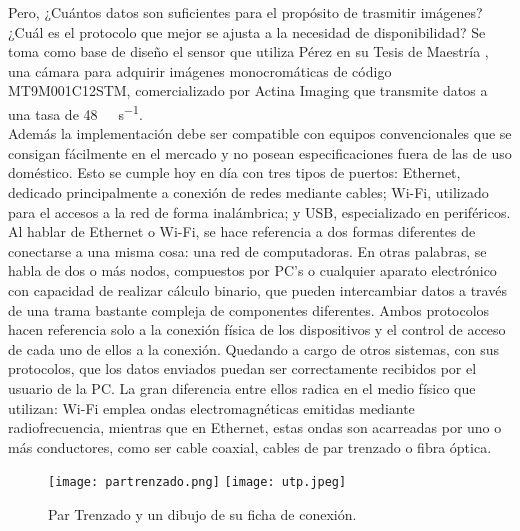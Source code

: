 


Pero, ¿Cuántos datos son suficientes para el propósito de trasmitir imágenes? ¿Cuál es el protocolo que mejor se ajusta a la necesidad de disponibilidad? Se toma como base de diseño el sensor que utiliza Pérez en su Tesis de Maestría \cite{Perez2018}, una cámara para adquirir imágenes monocromáticas de código MT9M001C12STM, comercializado por Actina Imaging \cite{MicronTechnology2004} que transmite datos a una tasa de \SI{48}{\mega\bit\per\second}.\\

Además la implementación debe ser compatible con equipos convencionales que se consigan fácilmente en el mercado y no posean especificaciones fuera de las de uso doméstico. Esto se cumple hoy en día con tres tipos de puertos: Ethernet, dedicado principalmente a conexión de redes mediante cables; Wi-Fi, utilizado para el accesos a la red de forma inalámbrica; y USB, especializado en periféricos.\\

Al hablar de Ethernet o Wi-Fi, se hace referencia a dos formas diferentes de conectarse a una misma cosa: una red de computadoras. En otras palabras, se habla de dos o más nodos, compuestos por PC's o cualquier aparato electrónico con capacidad de realizar cálculo binario, que pueden intercambiar datos a través de una trama bastante compleja de componentes diferentes. Ambos protocolos hacen referencia solo a la conexión física de los dispositivos y el control de acceso de cada uno de ellos a la conexión. Quedando a cargo de otros sistemas, con sus protocolos, que los datos enviados puedan ser correctamente recibidos por el usuario de la PC. La gran diferencia entre ellos radica en el medio físico que utilizan: Wi-Fi emplea ondas electromagnéticas emitidas mediante radiofrecuencia, mientras que en Ethernet, estas ondas son acarreadas por uno o más conductores, como ser cable coaxial, cables de par trenzado o fibra óptica.\\

\begin{figure}
	\centering
	\texttt{[image: partrenzado.png]}
	\texttt{[image: utp.jpeg]}
	\caption{Par Trenzado y un dibujo de su ficha de conexión.}
	\label{fig:utp}
\end{figure}

